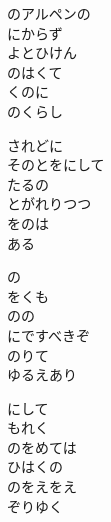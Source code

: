 \documentclass[10pt,b5j]{tarticle} %
\begin{document}
\vspace{1.5em} %
\newcommand{\linespace}{0.5em} %
\newcommand{\blocksize}{0.5\hsize} %
\begin{enumerate} %
    \begin{minipage}[c]{\blocksize}
    
        \vspace{\linespace}
        \item
        のアルペンの\\
        にからず\\
        よとひけん\\
        のはくて\\
        くのに\\
        のくらし
        
        \vspace{\linespace}
        \item
        されどに\\
        そのとをにして\\
        たるの\\
        とがれりつつ\\
        をのは\\
        ある
        
        \vspace{\linespace}
        \item
        の\\
        をくも\\
        のの\\
        にですべきぞ\\
        のりて\\
        ゆるえあり
        
        \vspace{\linespace}
        \item
        にして\\
        もれく\\
        のをめては\\
        ひはくの\\
        のをえをえ\\
        ぞりゆく
        

\end{minipage}
\end{enumerate}
\end{document}
